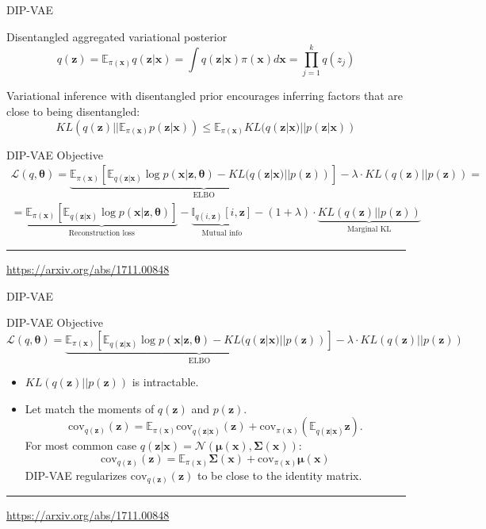 \documentclass{beamer}
\newcommand{\bx}{\mathbf{x}}
\newcommand{\bz}{\mathbf{z}}
\newcommand{\bmu}{\boldsymbol{\mu}}
\newcommand{\bSigma}{\boldsymbol{\Sigma}}
\newcommand{\bbE}{\mathbb{E}}
\newcommand{\cN}{\mathcal{N}}
\newcommand{\btheta}{\boldsymbol{\theta}}
\begin{document}
\begin{frame}{DIP-VAE}
	\begin{block}{Disentangled aggregated variational posterior}
		\vspace{-0.3cm}
		\[
		q(\bz) = \bbE_{\pi(\bx)} q(\bz | \bx) = \int q(\bz | \bx) \pi(\bx) d\bx = \prod_{j=1}^k q(z_j)
		\]
		\vspace{-0.3cm}
	\end{block}
	Variational inference with disentangled prior encourages inferring factors that are close to being disentangled:
	\[
		KL(q(\bz) || \bbE_{\pi(\bx)} p(\bz | \bx)) \leq \bbE_{\pi(\bx)} KL(q(\bz | \bx) || p(\bz | \bx))	
	\]
	\begin{block}{DIP-VAE Objective}
		\vspace{-0.3cm}
		{\footnotesize
			\begin{multline*}
			\mathcal{L}(q, \btheta) = \underbrace{\bbE_{\pi(\bx)} \left[ \mathbb{E}_{q(\bz | \bx)} \log p(\bx | \bz, \btheta) - KL(q(\bz | \bx) || p(\bz)) \right]}_{\text{ELBO}} -\lambda \cdot KL(q(\bz) || p(\bz)) = \\
			= \underbrace{\bbE_{\pi(\bx)} \left[\mathbb{E}_{q(\bz | \bx)} \log p(\bx | \bz, \btheta)\right]}_{\text{Reconstruction loss}} - \underbrace{\mathbb{I}_{q(i, \bz)} [i, \bz]}_{\text{Mutual info}} - (1 + \lambda) \cdot \underbrace{KL(q(\bz) || p(\bz))}_{\text{Marginal KL}}
			\end{multline*}
		}
		\vspace{-0.3cm}
	\end{block}

	\vfill
	\hrule\medskip
	{\scriptsize \href{https://arxiv.org/abs/1711.00848}{https://arxiv.org/abs/1711.00848}}
\end{frame}
\begin{frame}{DIP-VAE}
	\begin{block}{DIP-VAE Objective}
		\vspace{-0.3cm}
		{\footnotesize
			\[
				\mathcal{L}(q, \btheta) = \underbrace{\bbE_{\pi(\bx)} \left[ \mathbb{E}_{q(\bz | \bx)} \log p(\bx | \bz, \btheta) - KL(q(\bz | \bx) || p(\bz)) \right]}_{\text{ELBO}} -\lambda \cdot KL(q(\bz) || p(\bz))
			\]
		}
		\vspace{-0.3cm}
	\end{block}
	\begin{itemize}
		\item $KL(q(\bz) || p(\bz))$ is intractable.
		\item Let match the moments of $q(\bz)$ and $p(\bz)$.
		\[
		\text{cov}_{q(\bz)}(\bz) = \bbE_{\pi(\bx)} \text{cov}_{q(\bz|\bx)}(\bz) + \text{cov}_{\pi(\bx)} \left( \bbE_{q(\bz | \bx)}\bz \right).
		\]
		For most common case $q(\bz | \bx) = \cN(\bmu(\bx), \bSigma(\bx))$:
		\[
		\text{cov}_{q(\bz)}(\bz) = \bbE_{\pi(\bx)} \bSigma(\bx) + \text{cov}_{\pi(\bx)} \bmu(\bx)
		\]
		DIP-VAE regularizes $\text{cov}_{q(\bz)}(\bz) $ to be close to the identity matrix.
	\end{itemize}
	
	\vfill
	\hrule\medskip
	{\scriptsize \href{https://arxiv.org/abs/1711.00848}{https://arxiv.org/abs/1711.00848}}
\end{frame}
\end{document}
